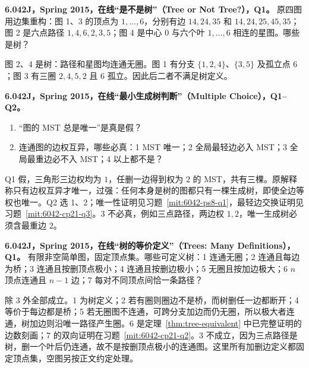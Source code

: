 \begin{exercise}\label{mit:6042-online-tree-or-not-tree-q1}
\textbf{6.042J，Spring 2015，在线“是不是树”（Tree or Not Tree?），Q1。}
原四图用边集重构：图 1、3 的顶点为 $1,\ldots,6$，分别有边 $14,24,35$ 和 $14,24,25,45,35$；图 2 是六点路径 $1,4,6,2,3,5$；图 4 是中心 $0$ 与六个叶 $1,\ldots,6$ 相连的星图。哪些是树？
\end{exercise}
\begin{solution}
图 2、4 是树：路径和星图均连通无圈。图 1 有分支 $\{1,2,4\}$、$\{3,5\}$ 及孤立点 $6$；图 3 有三圈 $2,4,5,2$ 且 $6$ 孤立。因此后二者不满足树定义。
\end{solution}

\begin{exercise}
\textbf{6.042J，Spring 2015，在线“最小生成树判断”（Multiple Choice），Q1--Q2。}
\begin{enumerate}[label=Q\arabic*.]
\item\label{mit:6042-online-multiple-choice-q1} “图的 MST 总是唯一”是真是假？
\item\label{mit:6042-online-multiple-choice-q2} 连通图的边权互异，哪些必真：1 MST 唯一；2 全局最轻边必入 MST；3 全局最重边必不入 MST；4 以上都不是？
\end{enumerate}
\end{exercise}
\begin{solution}
Q1 假，三角形三边权均为 $1$，任删一边得到权为 $2$ 的 MST，共有三棵。原解释称只有边权互异才唯一，过强：任何本身是树的图都只有一棵生成树，即使全边等权也唯一。Q2 选 1、2；唯一性证明见习题~\ref{mit:6042-ps8-q1}，最轻边交换证明见习题~\ref{mit:6042-cp21-q3}。3 不必真，例如三点路径，两边权 $1,2$，唯一生成树必须含最重边 $2$。
\end{solution}

\begin{exercise}\label{mit:6042-online-trees-many-definitions-q1}
\textbf{6.042J，Spring 2015，在线“树的等价定义”（Trees: Many Definitions），Q1。}
有限非空简单图，固定顶点集。哪些可定义树：1 连通无圈；2 连通且每边为桥；3 连通且按删顶点极小；4 连通且按删边极小；5 无圈且按加边极大；6 $n$ 顶点连通且 $n-1$ 边；7 每对不同顶点间恰一条路径？
\end{exercise}
\begin{solution}
除 3 外全部成立。1 为树定义；2 若有圈则圈边不是桥，而树删任一边都断开；4 等价于每边都是桥；5 若无圈图不连通，可跨分支加边而仍无圈，所以极大者连通，树加边则沿唯一路径产生圈。6 是定理~\ref{thm:tree-equivalent} 中已完整证明的边数刻画；7 的双向证明在习题~\ref{mit:6042-cp21-q2}。3 不成立，因为三点路径是树，删一个叶后仍连通，故不是按删顶点极小的连通图。这里所有加删边定义都固定顶点集，空图另按正文约定处理。
\end{solution}


